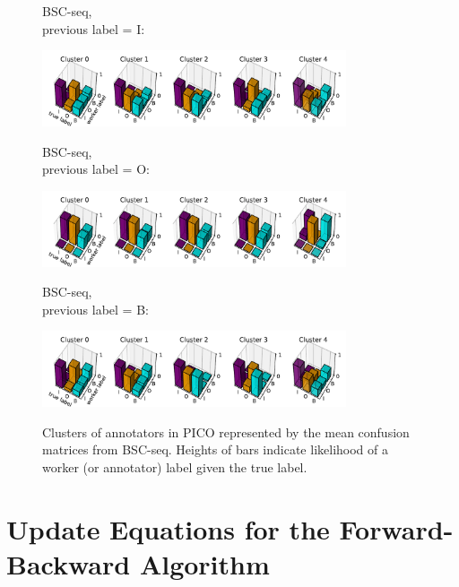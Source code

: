 \documentclass[11pt,a4paper]{article}
\begin{document}
\begin{figure}[t]
\begin{minipage}[b][1cm][l]{0.2\textwidth} 
BSC-seq, \\
previous label = I:
\end{minipage}
  \includegraphics[width=0.8\textwidth, clip=True, trim=10 0 0 10]{figures/worker_models/seq_prev0}
\\
\begin{minipage}[b][1cm][l]{0.2\textwidth} 
BSC-seq, \\
previous label = O:
\end{minipage}
  \includegraphics[width=0.8\textwidth, clip=True, trim=10 0 0 0]{figures/worker_models/seq_prev1}
\\
\begin{minipage}[b][1cm][l]{0.2\textwidth} 
BSC-seq,\\
 previous label = B:
\end{minipage}
  \includegraphics[width=0.8\textwidth, clip=True, trim=10 0 0 0]{figures/worker_models/seq_prev2}
\\
\caption{Clusters of annotators in PICO represented by the 
mean confusion matrices from BSC-seq. Heights of bars indicate likelihood of a worker (or annotator) label given the true label.
}
\label{fig:anno_models_2}
\end{figure}

\section{Update Equations for the Forward-Backward Algorithm}
\end{document}
